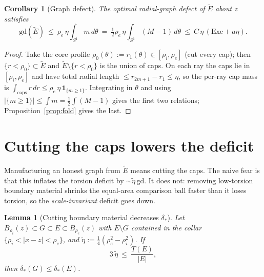 \documentclass[11pt]{article}
\newtheorem{lemma}[theorem]{Lemma}
\newtheorem{corollary}[theorem]{Corollary}
\theoremstyle{definition}
\newcommand{\gd}{\mathrm{gd}}
\newcommand{\Etil}{\widetilde E}
\newcommand{\Exc}{\mathrm{Exc}}
\newcommand{\abs}[1]{\left|#1\right|}
\newcommand{\dstar}{\delta_{*}}
\begin{document}
\begin{corollary}[Graph defect]\label{cor:gd}
The optimal radial-graph defect of $\Etil$ about $z$ satisfies
\begin{equation}\label{eq:gd}
   \gd(\Etil)\ \le\ \rho_e\,\eta\!\int_{S^1}\!m\,d\theta
   \ =\ \tfrac12\rho_e\,\eta\!\int_{S^1}\!(M-1)\,d\theta
   \ \le\ C\,\eta\,(\Exc+a\eta).
\end{equation}
\end{corollary}

\begin{proof}
Take the core profile $\rho_0(\theta):=r_1(\theta)\in[\rho_i,\rho_e]$ (cut
every cap); then $\{r<\rho_0\}\subset\Etil$ and $\Etil\setminus\{r<\rho_0\}$
is the union of caps. On each ray the caps lie in $[\rho_i,\rho_e]$ and have
total radial length $\le r_{2m+1}-r_1\le\eta$, so the per-ray cap mass is
$\int_{\text{caps}}r\,dr\le\rho_e\,\eta\,\mathbf 1_{\{m\ge1\}}$. Integrating
in $\theta$ and using $\abs{\{m\ge1\}}\le\int m=\tfrac12\int(M-1)$ gives the
first two relations; Proposition~\ref{prop:fold} gives the last.
\end{proof}

\section{Cutting the caps lowers the deficit}
\label{sec:cut}

Manufacturing an honest graph from $\Etil$ means cutting the caps. The
naive fear is that this inflates the torsion deficit by
$\sim\tilde\eta\,\gd$. It does not: removing low-torsion boundary material
shrinks the equal-area comparison ball faster than it loses torsion, so the
\emph{scale-invariant} deficit goes down.

\begin{lemma}[Cutting boundary material decreases $\dstar$]\label{lem:cutdeficit}
Let $B_{\rho_i}(z)\subset G\subset E\subset B_{\rho_e}(z)$ with
$E\setminus G$ contained in the collar $\{\rho_i<\abs{x-z}<\rho_e\}$, and
$\tilde\eta:=\tfrac14(\rho_e^2-\rho_i^2)$. If
\begin{equation}\label{eq:cutcond}
   3\,\tilde\eta\ \le\ \frac{T(E)}{\abs E},
\end{equation}
then $\dstar(G)\le\dstar(E)$.
\end{lemma}
\end{document}
